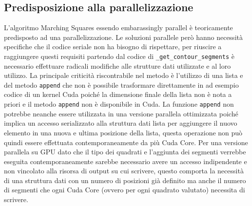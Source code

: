 \documentclass[12pt,a4paper]{report}
\begin{document}
\subsection{Predisposizione alla parallelizzazione}
L'algoritmo Marching Squares essendo embarassingly parallel è teoricamente predisposto ad una parallelizzazione. Le soluzioni parallele però hanno necessità specifiche che il codice seriale non ha bisogno di rispettare,  per riuscire a raggiungere questi requisiti partendo dal codice di  \verb|_get_contour_segments| è necessario effettuare radicali modifiche alle strutture dati utilizzate e al loro utilizzo. \newline
La principale criticità riscontrabile nel metodo è l'utilizzo di una lista e del metodo \verb|append| che non è possibile trasformare direttamente in ad esempio codice di un kernel Cuda poiché la dimensione finale della lista non è nota a priori e il metodo  \verb|append| non è disponibile in Cuda.  La funzione \verb|append| non potrebbe neanche essere utilizzata in una versione parallela ottimizzata poiché implica un accesso serializzato alla struttura dati lista per aggiungere il nuovo elemento in una nuova e ultima posizione della lista, questa operazione non può quindi essere effettuata contemporaneamente da più Cuda Core.  Per una versione parallela su GPU dato che il tipo dei quadrati e l'aggiunta dei segmenti verrebbe eseguita contemporaneamente sarebbe necessario avere un accesso indipendente e non vincolato alla risorsa di output su cui scrivere,  questo comporta la necessità di una struttura dati con un numero di posizioni già definito ma anche il numero di segmenti che ogni Cuda Core (ovvero per ogni quadrato valutato) necessita di scrivere.

\end{document}
